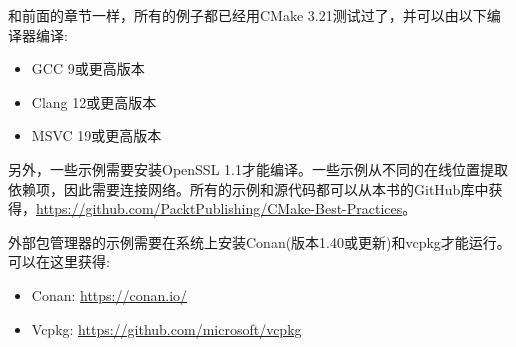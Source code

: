 和前面的章节一样，所有的例子都已经用CMake 3.21测试过了，并可以由以下编译器编译:

\begin{itemize}
\item 
GCC 9或更高版本

\item 
Clang 12或更高版本

\item 
MSVC 19或更高版本
\end{itemize}

另外，一些示例需要安装OpenSSL 1.1才能编译。一些示例从不同的在线位置提取依赖项，因此需要连接网络。所有的示例和源代码都可以从本书的GitHub库中获得，\url{https://github.com/PacktPublishing/CMake-Best-Practices}。

外部包管理器的示例需要在系统上安装Conan(版本1.40或更新)和vcpkg才能运行。可以在这里获得:

\begin{itemize}
\item 
Conan: \url{https://conan.io/}

\item 
Vcpkg: \url{https://github.com/microsoft/vcpkg}
\end{itemize}
































